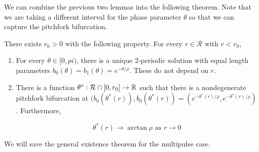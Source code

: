 \documentclass[thesis.tex]{subfiles}
\begin{document}
We can combine the previous two lemmas into the following theorem. Note that we are taking a different interval for the phase parameter $\theta$ so that we can capture the pitchfork bifurcation.


\begin{theorem}\label{2pulsebifurcation}
There exists $r_0 > 0$ with the following property. For every $r \in \mathcal{R}$ with $r < r_0$,
\begin{enumerate}
	\item For every $\theta \in [0, pi)$, there is a unique 2-periodic solution with equal length parameters $b_0(\theta) = b_1(\theta) = e^{-\theta/\rho}$. These do not depend on $r$.

	\item There is a function $\theta^*: \mathcal{R} \cap [0, r_0] \rightarrow {\mathbb R}$ such that there is a nondegenerate pitchfork bifurcation at $(b_0(\theta^*(r)),b_0(\theta^*(r)) = (e^{-\theta^*(r)/\rho}, e^{-\theta^*(r)/\rho})$. Furthermore, 

	\begin{equation*}
	\theta^*(r) \rightarrow \arctan \rho \text{ as } r \rightarrow 0
	\end{equation*}
\end{enumerate}
\end{theorem}

We will save the general existence theorem for the multipulse case.





\end{document}
